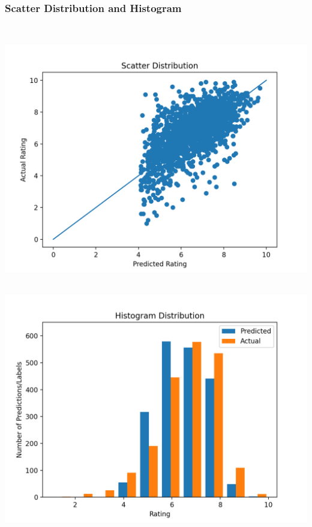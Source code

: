 \documentclass[11pt]{article}
\begin{document}
\subsubsection{Scatter Distribution and Histogram}
\mbox{}\\
\begin{minipage}{0.45\textwidth}
\includegraphics[scale=0.5]{bert/scatter.png}
\end{minipage}
\hfill
\begin{minipage}{0.45\textwidth}
\mbox{}\\
\includegraphics[scale=0.5]{bert/histogram.png}
\end{minipage}
\end{document}
